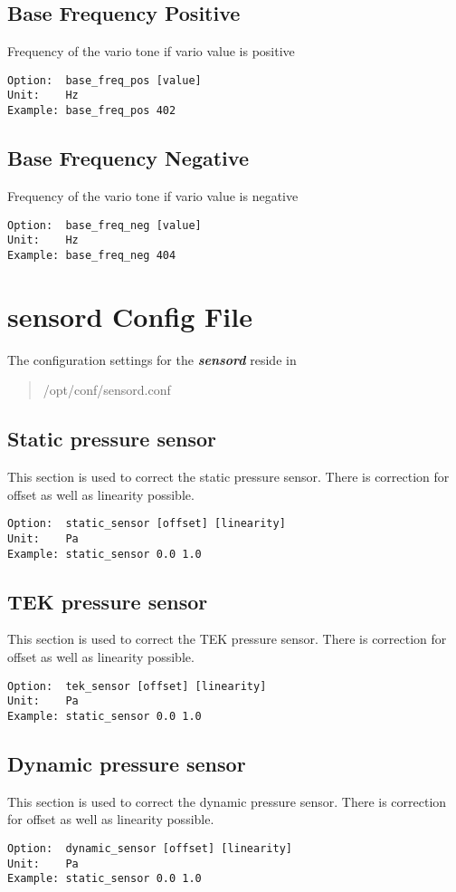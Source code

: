 \subsection{Base Frequency Positive}
Frequency of the vario tone if vario value is positive
\begin{lstlisting}
Option:  base_freq_pos [value]
Unit:    Hz
Example: base_freq_pos 402
\end{lstlisting}

\subsection{Base Frequency Negative}
Frequency of the vario tone if vario value is negative
\begin{lstlisting}
Option:  base_freq_neg [value]
Unit:    Hz
Example: base_freq_neg 404
\end{lstlisting}

\pagebreak

\section{sensord Config File}

The configuration settings for the \textbf{\textit{sensord}} reside in 
\begin{quote}
	/opt/conf/sensord.conf
\end{quote}

\subsection{Static pressure sensor}
This section is used to correct the static pressure sensor. There is correction for offset as well as linearity possible.
\begin{lstlisting}
Option:  static_sensor [offset] [linearity]
Unit:    Pa
Example: static_sensor 0.0 1.0
\end{lstlisting}

\subsection{TEK pressure sensor}
This section is used to correct the TEK pressure sensor. There is correction for offset as well as linearity possible.
\begin{lstlisting}
Option:  tek_sensor [offset] [linearity]
Unit:    Pa
Example: static_sensor 0.0 1.0
\end{lstlisting}

\subsection{Dynamic pressure sensor}
This section is used to correct the dynamic pressure sensor. There is correction for offset as well as linearity possible.
\begin{lstlisting}
Option:  dynamic_sensor [offset] [linearity]
Unit:    Pa
Example: static_sensor 0.0 1.0
\end{lstlisting}

